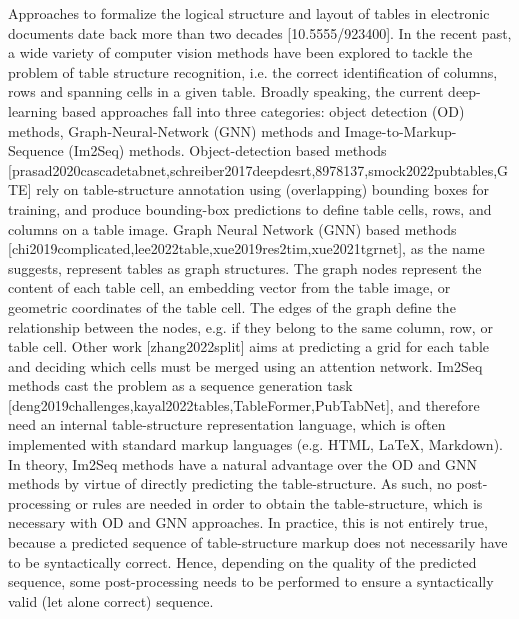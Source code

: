 \documentclass[11pt,a4paper]{article}
\begin{document}
Approaches to formalize the logical structure and layout of tables in electronic documents date back more than two decades [10.5555/923400]. In the recent past, a wide variety of computer vision methods have been explored to tackle the problem of table structure recognition, i.e. the correct identification of columns, rows and spanning cells in a given table. Broadly speaking, the current deep-learning based approaches fall into three categories: object detection (OD) methods, Graph-Neural-Network (GNN) methods and Image-to-Markup-Sequence (Im2Seq) methods. Object-detection based methods [prasad2020cascadetabnet,schreiber2017deepdesrt,8978137,smock2022pubtables,GTE] rely on table-structure annotation using (overlapping) bounding boxes for training, and produce bounding-box predictions to define table cells, rows, and columns on a table image. 
Graph Neural Network (GNN) based methods [chi2019complicated,lee2022table,xue2019res2tim,xue2021tgrnet], as the name suggests, represent tables as graph structures. The graph nodes represent the content of each table cell, an embedding vector from the table image, or geometric coordinates of the table cell. The edges of the graph define the relationship between the nodes, e.g. if they belong to the same column, row, or table cell. Other work [zhang2022split] aims at predicting a grid for each table and deciding which cells must be merged using an attention network. 
Im2Seq methods cast the problem as a sequence generation task [deng2019challenges,kayal2022tables,TableFormer,PubTabNet], and therefore need an internal table-structure representation language, which is often implemented with standard markup languages (e.g. HTML, LaTeX, Markdown). 
In theory, Im2Seq methods have a natural advantage over the OD and GNN methods by virtue of directly predicting the table-structure. As such, no post-processing or rules are needed in order to obtain the table-structure, which is necessary with OD and GNN approaches. In practice, this is not entirely true, because a predicted sequence of table-structure markup does not necessarily have to be syntactically correct. Hence, depending on the quality of the predicted sequence, some post-processing needs to be performed to ensure a syntactically valid (let alone correct) sequence.
\end{document}

